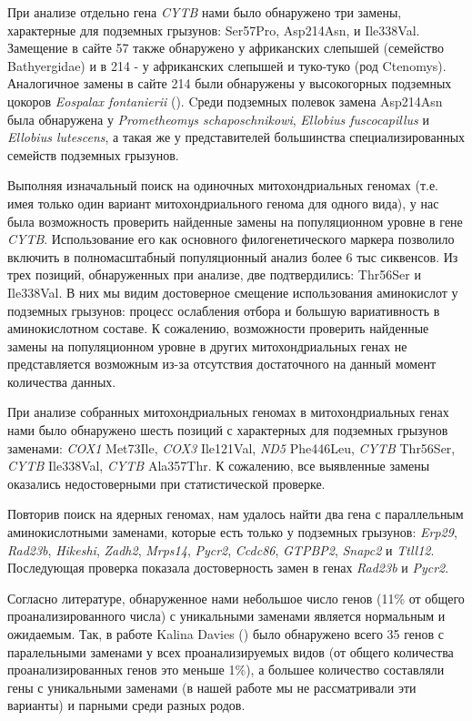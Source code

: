 При анализе отдельно гена \textit{CYTB} нами было обнаружено три замены, характерные для подземных грызунов: Ser57Pro, Asp214Asn, и Ile338Val. Замещение в сайте 57 также обнаружено у африканских слепышей (семейство Bathyergidae) и в 214 - у африканских слепышей и туко-туко (род Ctenomys). Аналогичное замены в сайте 214 были обнаружены у высокогорных подземных цокоров \textit{Eospalax fontanierii} (\cite{Cooper1993}). Cреди подземных полевок замена Asp214Asn была обнаружена у \textit{Prometheomys schaposchnikowi}, \textit{Ellobius fuscocapillus} и \textit{Ellobius lutescens}, а такая же у представителей большинства специализированных семейств подземных грызунов.

Выполняя изначальный поиск на одиночных митохондриальных геномах (т.е. имея только один вариант митохондриального генома для одного вида), у нас была возможность проверить найденные замены на популяционном уровне в гене \textit{CYTB}. Использование его как основного филогенетического маркера позволило включить в полномасштабный популяционный анализ более 6 тыс сиквенсов. Из трех позиций, обнаруженных при анализе, две подтвердились: Thr56Ser и Ile338Val. В них мы видим достоверное смещение использования аминокислот у подземных грызунов: процесс ослабления отбора и большую вариативность в аминокислотном составе. К сожалению, возможности проверить найденные замены на популяционном уровне в других митохондриальных генах не представляется возможным из-за отсутствия достаточного на данный момент количества данных. 


При анализе собранных митохондриальных геномах в митохондриальных генах нами было обнаружено шесть позиций с характерных для подземных грызунов заменами: \textit{COX1} Met73Ile, \textit{COX3} Ile121Val, \textit{ND5} Phe446Leu, \textit{CYTB} Thr56Ser, \textit{CYTB} Ile338Val, \textit{CYTB} Ala357Thr. К сожалению, все выявленные замены оказались недостоверными при статистической проверке. 


Повторив поиск на ядерных геномах, нам удалось найти два гена с параллельным аминокислотными заменами, которые есть только у подземных грызунов: \textit{Erp29}, \textit{Rad23b}, \textit{Hikeshi}, \textit{Zadh2}, \textit{Mrps14}, \textit{Pycr2}, \textit{Ccdc86}, \textit{GTPBP2}, \textit{Snapc2} и \textit{Ttll12}. Последующая проверка показала достоверность замен в генах \textit{Rad23b} и \textit{Pycr2}.

Согласно литературе, обнаруженное нами небольшое число генов (11\% от общего проанализированного числа) с уникальными заменами  является нормальным и ожидаемым. Так, в работе Kalina Davies (\cite{Davies2018}) было обнаружено всего 35 генов с паралельными заменами у всех проанализируемых видов (от общего количества проанализированных генов это меньше 1\%), а большее количество составляли гены с уникальными заменами (в нашей работе мы не рассматривали эти варианты) и парными среди разных родов. 

